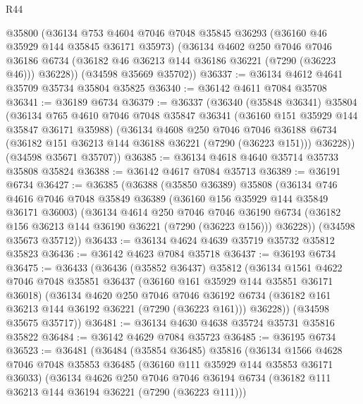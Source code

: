 \begin{lexlean}{R44}
\begin{coremodule}
{      @35800
      (@36134
        @753
        @4604
        @7046
        @7048
        @35845
        @36293
        (@36160 @46 @35929 @144 @35845 @36171 @35973)
        (@36134
          @4602
          @250
          @7046
          @7046
          @36186
          @6734
          (@36182 @46 @36213 @144 @36186 @36221 (@7290 (@36223 @46)))
          @36228))
      (@34598 @35669 @35702))
@36337 := @36134 @4612 @4641 @35709 @35734 @35804 @35825
@36340 := @36142 @4611 @7084 @35708
@36341 := @36189 @6734
@36379 := @36337
    (@36340
      (@35848 @36341)
      @35804
      (@36134
        @765
        @4610
        @7046
        @7048
        @35847
        @36341
        (@36160 @151 @35929 @144 @35847 @36171 @35988)
        (@36134
          @4608
          @250
          @7046
          @7046
          @36188
          @6734
          (@36182 @151 @36213 @144 @36188 @36221 (@7290 (@36223 @151)))
          @36228))
      (@34598 @35671 @35707))
@36385 := @36134 @4618 @4640 @35714 @35733 @35808 @35824
@36388 := @36142 @4617 @7084 @35713
@36389 := @36191 @6734
@36427 := @36385
    (@36388
      (@35850 @36389)
      @35808
      (@36134
        @746
        @4616
        @7046
        @7048
        @35849
        @36389
        (@36160 @156 @35929 @144 @35849 @36171 @36003)
        (@36134
          @4614
          @250
          @7046
          @7046
          @36190
          @6734
          (@36182 @156 @36213 @144 @36190 @36221 (@7290 (@36223 @156)))
          @36228))
      (@34598 @35673 @35712))
@36433 := @36134 @4624 @4639 @35719 @35732 @35812 @35823
@36436 := @36142 @4623 @7084 @35718
@36437 := @36193 @6734
@36475 := @36433
    (@36436
      (@35852 @36437)
      @35812
      (@36134
        @1561
        @4622
        @7046
        @7048
        @35851
        @36437
        (@36160 @161 @35929 @144 @35851 @36171 @36018)
        (@36134
          @4620
          @250
          @7046
          @7046
          @36192
          @6734
          (@36182 @161 @36213 @144 @36192 @36221 (@7290 (@36223 @161)))
          @36228))
      (@34598 @35675 @35717))
@36481 := @36134 @4630 @4638 @35724 @35731 @35816 @35822
@36484 := @36142 @4629 @7084 @35723
@36485 := @36195 @6734
@36523 := @36481
    (@36484
      (@35854 @36485)
      @35816
      (@36134
        @1566
        @4628
        @7046
        @7048
        @35853
        @36485
        (@36160 @111 @35929 @144 @35853 @36171 @36033)
        (@36134
          @4626
          @250
          @7046
          @7046
          @36194
          @6734
          (@36182 @111 @36213 @144 @36194 @36221 (@7290 (@36223 @111)))
}
\end{coremodule}
\end{lexlean}
